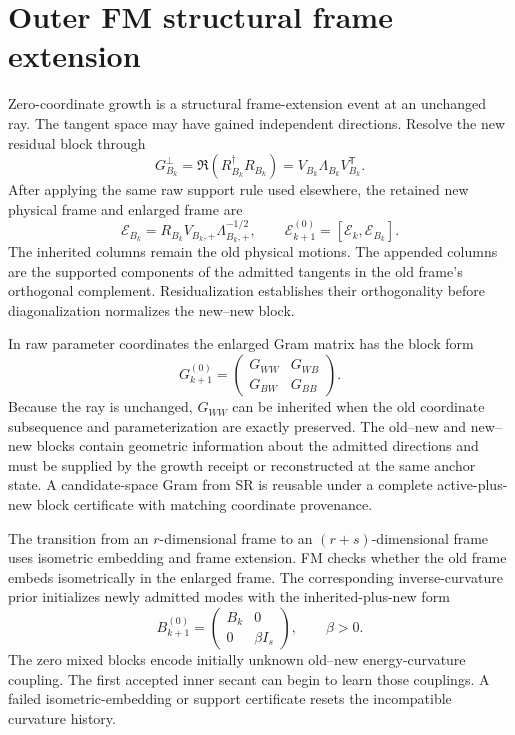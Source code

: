 \documentclass[10pt,twocolumn]{article}
\begin{document}
\section*{Outer FM structural frame extension}

Zero-coordinate growth is a structural frame-extension event at an unchanged
ray. The tangent space may have gained independent directions. Resolve the new
residual block through
\begin{equation}
G_{B_k}^{\perp}
=\Re(R_{B_k}^{\dagger}R_{B_k})
=V_{B_k}\Lambda_{B_k}V_{B_k}^{\mathsf T}.
\label{eq:fm-growth-residual-gram}
\end{equation}
After applying the same raw support rule used elsewhere, the retained new
physical frame and enlarged frame are
\begin{equation}
\mathcal E_{B_k}
=R_{B_k}V_{B_k,+}\Lambda_{B_k,+}^{-1/2},
\qquad
\mathcal E_{k+1}^{(0)}
=[\mathcal E_k,\mathcal E_{B_k}].
\label{eq:fm-growth-frame-extension}
\end{equation}
The inherited columns remain the old physical motions. The appended columns
are the supported components of the admitted tangents in the old frame's
orthogonal complement. Residualization establishes their
orthogonality before diagonalization normalizes the new--new block.

In raw parameter coordinates the enlarged Gram matrix has the block form
\begin{equation}
G_{k+1}^{(0)}
=
\begin{pmatrix}
G_{WW}&G_{WB}\\
G_{BW}&G_{BB}
\end{pmatrix}.
\label{eq:fm-growth-gram-blocks}
\end{equation}
Because the ray is unchanged, \(G_{WW}\) can be inherited when the old
coordinate subsequence and parameterization are exactly preserved. The
old--new and new--new blocks contain geometric information about the admitted
directions and must be supplied by the growth receipt or reconstructed at the
same anchor state. A candidate-space Gram from SR is reusable under a complete
active-plus-new block certificate with matching coordinate provenance.

The transition from an \(r\)-dimensional frame to an
\((r+s)\)-dimensional frame uses isometric embedding and frame extension. FM
checks whether the old frame embeds isometrically in the enlarged frame. The
corresponding inverse-curvature prior initializes newly admitted modes with
the inherited-plus-new form
\begin{equation}
B_{k+1}^{(0)}
=
\begin{pmatrix}
B_k&0\\
0&\beta I_s
\end{pmatrix},
\qquad \beta>0.
\label{eq:fm-growth-curvature-extension}
\end{equation}
The zero mixed blocks encode initially unknown old--new energy-curvature
coupling. The first accepted inner secant can begin to learn those couplings.
A failed isometric-embedding or support certificate resets the incompatible
curvature history.
\end{document}

